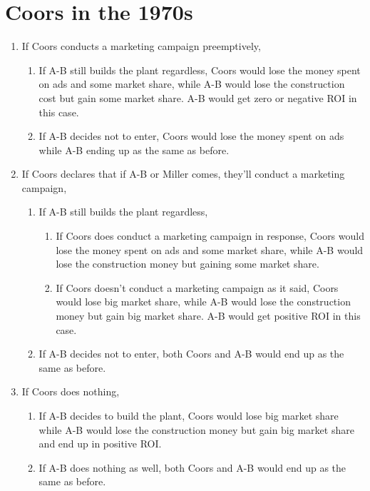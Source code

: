 \documentclass[a4paper]{article}
\begin{document}
    \section{Coors in the 1970s}
    \begin{answer}[problem]
    
    
    \begin{enumerate}
        \item If Coors conducts a marketing campaign preemptively,
        \begin{enumerate}
            \item If A-B still builds the plant regardless, Coors would lose the money spent on ads and some market share, while A-B would lose the construction cost but gain some market share. A-B would get zero or negative ROI in this case.
            \item If A-B decides not to enter, Coors would lose the money spent on ads while A-B ending up as the same as before.
        \end{enumerate}
        \item If Coors declares that if A-B or Miller comes, they'll conduct a marketing campaign,
        \begin{enumerate}
            \item If A-B still builds the plant regardless,
            \begin{enumerate}
                \item If Coors does conduct a marketing campaign in response, Coors would lose the money spent on ads and some market share, while A-B would lose the construction money but gaining some market share.
                \item If Coors doesn't conduct a marketing campaign as it said, Coors would lose big market share, while A-B would lose the construction money but gain big market share. A-B would get positive ROI in this case.
            \end{enumerate}
            \item If A-B decides not to enter, both Coors and A-B would end up as the same as before.
        \end{enumerate}
        \item If Coors does nothing,
        \begin{enumerate}
            \item If A-B decides to build the plant, Coors would lose big market share while A-B would lose the construction money but gain big market share and end up in positive ROI.
            \item If A-B does nothing as well, both Coors and A-B would end up as the same as before.
        \end{enumerate}
    \end{enumerate}


\end{answer}
\end{document}
